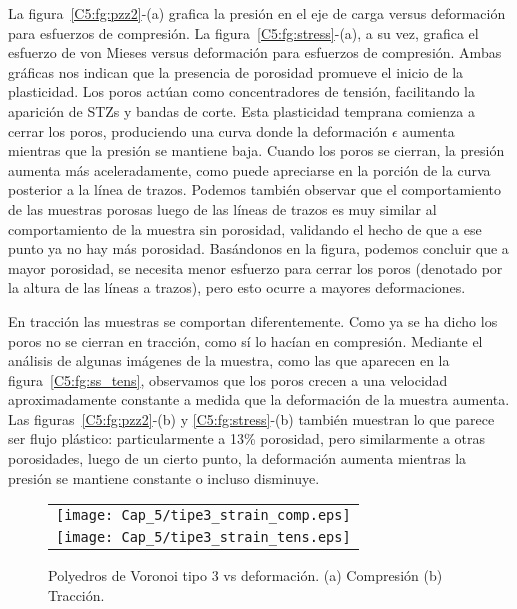 La figura~\ref{C5:fg:pzz2}-(a) grafica la presión en el eje de carga versus deformación para esfuerzos de compresión. La figura~\ref{C5:fg:stress}-(a),
a su vez, grafica el esfuerzo de von Mieses versus deformación para esfuerzos de compresión.
Ambas gráficas nos indican que la presencia de porosidad promueve el inicio de la plasticidad. Los poros actúan como concentradores de tensión,
facilitando la aparición de STZs y bandas de corte. Esta plasticidad temprana comienza a
cerrar los poros, produciendo una curva donde la deformación $\epsilon$ aumenta mientras que la presión se mantiene baja.
Cuando los poros se cierran, la presión aumenta más aceleradamente, como puede apreciarse en la porción de la curva posterior
a la línea de trazos. Podemos también observar que el comportamiento de las muestras porosas luego de las líneas de trazos es
muy similar al comportamiento de la muestra sin porosidad, validando el hecho de que a ese punto ya no hay más porosidad. Basándonos en la figura,
podemos concluir que a mayor porosidad, se necesita menor esfuerzo para cerrar los poros (denotado por la altura de las líneas a trazos),
pero esto ocurre a mayores deformaciones.

En tracción las muestras se comportan diferentemente. Como ya se ha dicho los poros no se cierran en tracción, como sí lo hacían en compresión.
Mediante el análisis de algunas imágenes de la muestra, como las que aparecen en la figura~\ref{C5:fg:ss_tens},
observamos que los poros crecen a una velocidad aproximadamente constante a medida que la deformación de la muestra aumenta. 
Las figuras~\ref{C5:fg:pzz2}-(b) y \ref{C5:fg:stress}-(b) también muestran lo que parece ser flujo plástico: particularmente a 13\% porosidad,
pero similarmente a otras porosidades, luego de un cierto punto, la deformación aumenta mientras la presión se mantiene constante o
incluso disminuye.

\begin{figure}[h!]
  \centering
  \begin{tabular} {c}
    \texttt{[image: Cap\_5/tipe3\_strain\_comp.eps]}\\
    \texttt{[image: Cap\_5/tipe3\_strain\_tens.eps]}\\
  \end{tabular}
  \caption[Polyedros de Voronoi tipo 3 vs deformación.]{Polyedros de Voronoi tipo 3 vs deformación. (a) Compresión (b) Tracción.}
  \label{C5:fg:tip3}
\end{figure}

